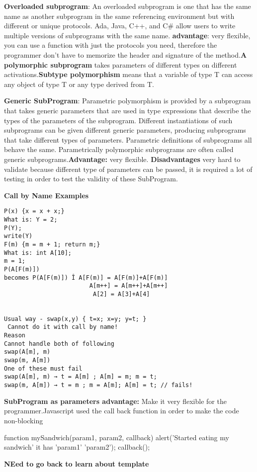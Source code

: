 \documentclass{article}
\begin{document}
\textbf{Overloaded subprogram}: An overloaded subprogram is one that has the same name as another subprogram in the same referencing environment but with different or unique protocols. Ada, Java, C++, and C\# allow users to write multiple versions of subprograms with the same name. \textbf{advantage}: very flexible, you can use a function with just the protocols you need, therefore the programmer don't have to memorize the header and signature of the method.\textbf{A polymorphic subprogram} takes parameters of different types on different activations.\textbf{Subtype polymorphism} means that a variable of type T can access any object of type T or any type derived from T.

\textbf{Generic SubProgram}: Parametric polymorphism is provided by a subprogram that takes generic parameters that are used in type expressions that describe the types
of the parameters of the subprogram. Different instantiations of such subprograms
can be given different generic parameters, producing subprograms that
take different types of parameters. Parametric definitions of subprograms all
behave the same. Parametrically polymorphic subprograms are often called
generic subprograms.\textbf{Advantage:} very flexible. \textbf{Disadvantages} very hard to validate because different type of parameters can be passed, it is required a lot of testing in order to test the validity of these SubProgram.


\textbf{Call by Name Examples}
\begin{lstlisting}
P(x) {x = x + x;} 
What is: Y = 2;
P(Y); 
write(Y)
F(m) {m = m + 1; return m;}
What is: int A[10]; 
m = 1;
P(A[F(m)])
becomes P(A[F(m)]) Î A[F(m)] = A[F(m)]+A[F(m)] 
 						A[m++] = A[m++]+A[m++]
						 A[2] = A[3]+A[4]
 					

Usual way - swap(x,y) { t=x; x=y; y=t; }
 Cannot do it with call by name!
Reason
Cannot handle both of following 
swap(A[m], m)
swap(m, A[m]) 
One of these must fail
swap(A[m], m) → t = A[m] ; A[m] = m; m = t;
swap(m, A[m]) → t = m ; m = A[m]; A[m] = t; // fails!
\end{lstlisting}

\textbf{SubProgram as parameters advantage:} Make it very flexible for the programmer.Javascript used the call back function in order to make the code non-blocking

function mySandwich(param1, param2, callback) {
	alert('Started eating my sandwich' it has 'param1' 'param2');
	callback();
}


\textbf{NEed to go back to learn about template}
\end{document}
